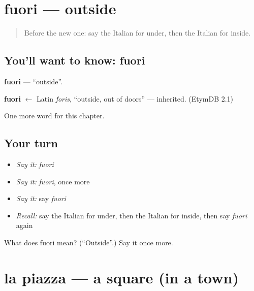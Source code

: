 \section[fuori]{fuori — outside}

\label{lesson:IT-C80-fuori}



\begin{quote}
Before the new one: say the Italian for under, then the Italian for inside.
\end{quote}

\subsection*{You'll want to know: fuori}
\textbf{fuori} — \textquotedblleft{}outside\textquotedblright{}.

\begin{cousinweb}
\textbf{fuori} $\leftarrow$ Latin \emph{foris}, \textquotedblleft{}outside, out of doors\textquotedblright{} — inherited. (EtymDB 2.1)
\end{cousinweb}

\begin{grammarlens}[title={What you've built}]
One more word for this chapter.
\end{grammarlens}

\subsection*{Your turn}
\begin{itemize}
\raggedright
  \item \emph{Say it:} \emph{fuori}
  \item \emph{Say it:} \emph{fuori}, once more
  \item \emph{Say it:} say \emph{fuori}
  \item \emph{Recall:} say the Italian for under, then the Italian for inside, then say \emph{fuori} again
\end{itemize}

\begin{tcolorbox}[breakable,colback=teal!4,colframe=teal!35!black,title={Before you move on}]
What does fuori mean? (\textquotedblleft{}Outside\textquotedblright{}.) Say it once more.
\end{tcolorbox}
\section[la piazza]{la piazza — a square (in a town)}

